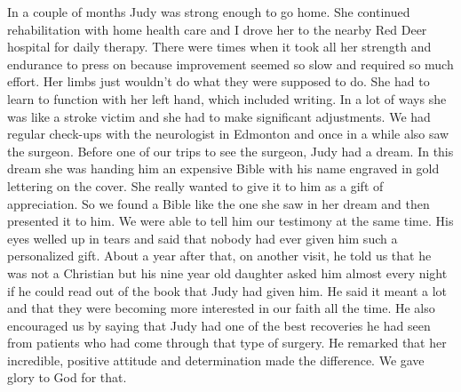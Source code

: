 \documentclass[twoside, 12pt]{book}
\begin{document}
In a couple of months Judy was strong enough to go home. She continued rehabilitation with home health care and I drove her to the nearby Red Deer hospital for daily therapy. There were times when it took all her strength and endurance to press on because improvement seemed so slow and required so much effort. Her limbs just wouldn’t do what they were supposed to do. She had to learn to function with her left hand, which included writing. In a lot of ways she was like a stroke victim and she had to make significant adjustments. We had regular check-ups with the neurologist in Edmonton and once in a while also saw the surgeon. Before one of our trips to see the surgeon, Judy had a dream. In this dream she was handing him an expensive Bible with his name engraved in gold lettering on the cover. She really wanted to give it to him as a gift of appreciation. So we found a Bible like the one she saw in her dream and then presented it to him. We were able to tell him our testimony at the same time. His eyes welled up in tears and said that nobody had ever given him such a personalized gift. About a year after that, on another visit, he told us that he was not a Christian but his nine year old daughter asked him almost every night if he could read out of the book that Judy had given him. He said it meant a lot and that they were becoming more interested in our faith all the time. He also encouraged us by saying that Judy had one of the best recoveries he had seen from patients who had come through that type of surgery. He remarked that her incredible, positive attitude and determination made the difference. We gave glory to God for that.
\end{document}
